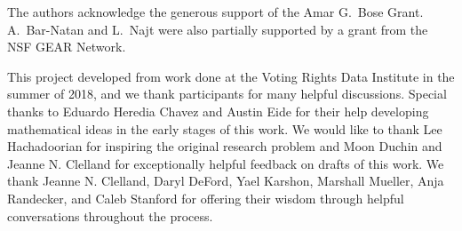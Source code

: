 
 The authors acknowledge the generous support of the Amar G.\ Bose Grant.  A.\ Bar-Natan and L.\ Najt were also partially supported by a grant from the NSF GEAR Network.

This project developed from work done at the Voting Rights Data Institute in the summer of 2018, and we thank participants for many helpful discussions. Special thanks to Eduardo Heredia Chavez and Austin Eide for their help developing mathematical ideas in the early stages of this work. We would like to thank Lee Hachadoorian for inspiring the original research problem and Moon Duchin and Jeanne N. Clelland for exceptionally helpful feedback on drafts of this work.  We thank Jeanne N. Clelland, Daryl DeFord, Yael Karshon, Marshall Mueller, Anja Randecker, and Caleb Stanford for offering their wisdom through helpful conversations throughout the process.